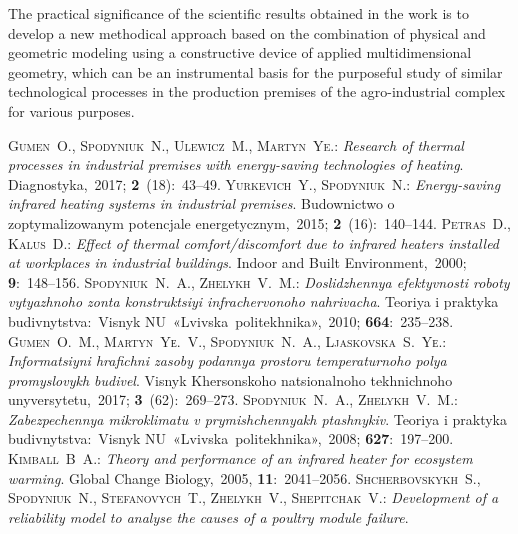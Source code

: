 \documentclass[12pt,twoside]{article}
\begin{document}
\begin{JGGarticle}
			The practical significance of the scientific results obtained in the work is to develop a new methodical approach based on the combination of physical and geometric modeling using a constructive device of applied multidimensional geometry, which can be an instrumental basis for the purposeful study of similar technological processes in the production premises of the agro-industrial complex for various purposes.
			
		\begin{thebibliography}{99}
				{\scshape Gumen~O., Spodyniuk~N., Ulewicz~M., Martyn~Ye.}:
				{\itshape Research of thermal processes in industrial premises with energy-saving technologies of heating}.
				Diagnostyka,~2017; \textbf{2}~(18):~43--49.
				{\scshape Yurkevich~Y., Spodyniuk~N.}:
				{\itshape Energy-saving infrared heating systems in industrial premises}.
				Budownictwo o zoptymalizowanym potencjale energetycznym,~2015; \textbf{2}~(16):~140--144.
				{\scshape Petras~D., Kalus~D.}:
				{\itshape Effect of thermal comfort/discomfort due to infrared heaters installed at workplaces in industrial buildings}.
				Indoor and Built Environment,~2000; \textbf{9}:~\mbox{148--156}.
				{\scshape Spodyniuk~N.~A., Zhelykh~V.~M.}:
				{\itshape Doslidzhennya efektyvnosti roboty vytyazhnoho zonta konstruktsiyi infrachervonoho nahrivacha}.
				Teoriya i praktyka budivnytstva:~Visnyk NU~«Lvivska~politekhnika»,~2010; \textbf{664}:~235--238.
				{\scshape Gumen~O.~M., Martyn~Yе.~V., Spodyniuk~N.~A., Ljaskovska~S.~Yе.}:
				{\itshape Informatsiyni hrafichni zasoby podannya prostoru temperaturnoho polya promyslovykh budivel}.
				Visnyk Khersonskoho natsionalnoho tekhnichnoho unyversytetu,~2017; \textbf{3}~(62):~269--273.
				{\scshape Spodyniuk~N.~A., Zhelykh~V.~M.}:
				{\itshape Zabezpechennya mikroklimatu v prymishchennyakh ptashnykiv}.
				Teoriya i praktyka budivnytstva:~Visnyk NU~«Lvivska~politekhnika»,~2008; \textbf{627}:~197--200.
				{\scshape Kimball~B~A.}:
				{\itshape Theory and performance of an infrared heater for ecosystem warming}.
				Global Change Biology,~2005, \textbf{11}:~2041--2056.
				{\scshape Shcherbovskykh~S., Spodyniuk~N., Stefanovych~T., Zhelykh~V., Shepitchak~V.}:
				{\itshape Development of a reliability model to analyse the causes of a poultry module failure}.

\end{thebibliography}
\end{JGGarticle}
\end{document}
